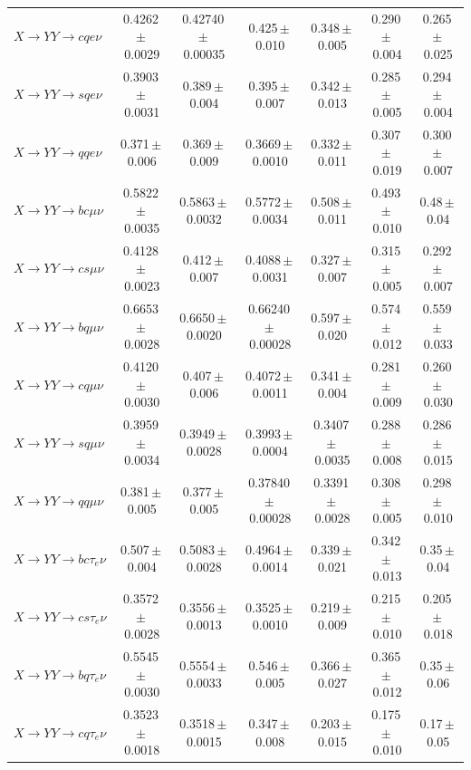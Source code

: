 \documentclass[12pt]{article}   %
\begin{document}
\begin{landscape}
{\begin{longtable}{@{\extracolsep{\fill}}lcccccc@{}}
$X\to YY\to cqe\nu$ & 0.4262\,$\pm$\,0.0029 & 0.42740\,$\pm$\,0.00035 & 0.425\,$\pm$\,0.010 & 0.348\,$\pm$\,0.005 & 0.290\,$\pm$\,0.004 & 0.265\,$\pm$\,0.025 \\
$X\to YY\to sqe\nu$ & 0.3903\,$\pm$\,0.0031 & 0.389\,$\pm$\,0.004 & 0.395\,$\pm$\,0.007 & 0.342\,$\pm$\,0.013 & 0.285\,$\pm$\,0.005 & 0.294\,$\pm$\,0.004 \\
$X\to YY\to qqe\nu$ & 0.371\,$\pm$\,0.006 & 0.369\,$\pm$\,0.009 & 0.3669\,$\pm$\,0.0010 & 0.332\,$\pm$\,0.011 & 0.307\,$\pm$\,0.019 & 0.300\,$\pm$\,0.007 \\
$X\to YY\to bc\mu\nu$ & 0.5822\,$\pm$\,0.0035 & 0.5863\,$\pm$\,0.0032 & 0.5772\,$\pm$\,0.0034 & 0.508\,$\pm$\,0.011 & 0.493\,$\pm$\,0.010 & 0.48\,$\pm$\,0.04 \\
$X\to YY\to cs\mu\nu$ & 0.4128\,$\pm$\,0.0023 & 0.412\,$\pm$\,0.007 & 0.4088\,$\pm$\,0.0031 & 0.327\,$\pm$\,0.007 & 0.315\,$\pm$\,0.005 & 0.292\,$\pm$\,0.007 \\
$X\to YY\to bq\mu\nu$ & 0.6653\,$\pm$\,0.0028 & 0.6650\,$\pm$\,0.0020 & 0.66240\,$\pm$\,0.00028 & 0.597\,$\pm$\,0.020 & 0.574\,$\pm$\,0.012 & 0.559\,$\pm$\,0.033 \\
$X\to YY\to cq\mu\nu$ & 0.4120\,$\pm$\,0.0030 & 0.407\,$\pm$\,0.006 & 0.4072\,$\pm$\,0.0011 & 0.341\,$\pm$\,0.004 & 0.281\,$\pm$\,0.009 & 0.260\,$\pm$\,0.030 \\
$X\to YY\to sq\mu\nu$ & 0.3959\,$\pm$\,0.0034 & 0.3949\,$\pm$\,0.0028 & 0.3993\,$\pm$\,0.0004 & 0.3407\,$\pm$\,0.0035 & 0.288\,$\pm$\,0.008 & 0.286\,$\pm$\,0.015 \\
$X\to YY\to qq\mu\nu$ & 0.381\,$\pm$\,0.005 & 0.377\,$\pm$\,0.005 & 0.37840\,$\pm$\,0.00028 & 0.3391\,$\pm$\,0.0028 & 0.308\,$\pm$\,0.005 & 0.298\,$\pm$\,0.010 \\
\midrule
$X\to YY\to bc\tau_e\nu$ & 0.507\,$\pm$\,0.004 & 0.5083\,$\pm$\,0.0028 & 0.4964\,$\pm$\,0.0014 & 0.339\,$\pm$\,0.021 & 0.342\,$\pm$\,0.013 & 0.35\,$\pm$\,0.04 \\
$X\to YY\to cs\tau_e\nu$ & 0.3572\,$\pm$\,0.0028 & 0.3556\,$\pm$\,0.0013 & 0.3525\,$\pm$\,0.0010 & 0.219\,$\pm$\,0.009 & 0.215\,$\pm$\,0.010 & 0.205\,$\pm$\,0.018 \\
$X\to YY\to bq\tau_e\nu$ & 0.5545\,$\pm$\,0.0030 & 0.5554\,$\pm$\,0.0033 & 0.546\,$\pm$\,0.005 & 0.366\,$\pm$\,0.027 & 0.365\,$\pm$\,0.012 & 0.35\,$\pm$\,0.06 \\
$X\to YY\to cq\tau_e\nu$ & 0.3523\,$\pm$\,0.0018 & 0.3518\,$\pm$\,0.0015 & 0.347\,$\pm$\,0.008 & 0.203\,$\pm$\,0.015 & 0.175\,$\pm$\,0.010 & 0.17\,$\pm$\,0.05 \\

\end{longtable}}
\end{landscape}
\end{document}
